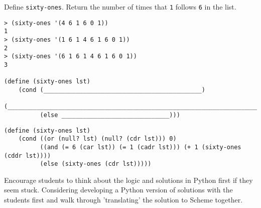 \begin{blocksection}
\question Define \lstinline$sixty-ones$. Return the number of times that \lstinline$1$
follows \lstinline$6$ in the list.

\begin{lstlisting}
> (sixty-ones '(4 6 1 6 0 1))
1
> (sixty-ones '(1 6 1 4 6 1 6 0 1))
2
> (sixty-ones '(6 1 6 1 4 6 1 6 0 1))
3

(define (sixty-ones lst)
    (cond (____________________________________________)
          (_______________________________________________________________________)
          (else ______________________________)))
\end{lstlisting}

\begin{solution}[1.5in]
\begin{lstlisting}
(define (sixty-ones lst)
    (cond ((or (null? lst) (null? (cdr lst))) 0)
          ((and (= 6 (car lst)) (= 1 (cadr lst))) (+ 1 (sixty-ones (cddr lst))))
          (else (sixty-ones (cdr lst)))))
\end{lstlisting}
\end{solution}
\end{blocksection}

\begin{meta}
    Encourage students to think about the logic and solutions in Python first if they seem stuck. Considering developing a Python version of solutions with the students first and walk through 'translating' the solution to Scheme together.
\end{meta}